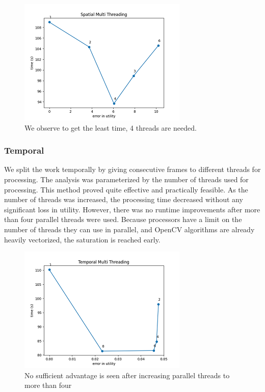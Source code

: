 \documentclass[conference]{IEEEtran}
\begin{document}
\begin{figure}[htbp]
    \centerline{\includegraphics{plots/plot_split_frame.png}}
    \caption{We observe to get the least time, 4 threads are needed.}
    \label{smt_evt}
\end{figure}


\subsubsection{Temporal}
We split the work temporally by giving consecutive frames to different threads for processing. The analysis was parameterized by the number of threads used for processing. This method proved quite effective and practically feasible. As the number of threads was increased, the processing time decreased without any significant loss in utility.
However, there was no runtime improvements after more than four parallel threads were used. Because processors have a limit on the number of threads they can use in parallel, and OpenCV algorithms are already heavily vectorized, the saturation is reached early.

\begin{figure}[htbp]
    \centerline{\includegraphics{plots/plot_split_video.png}}
    \caption{No sufficient advantage is seen after increasing parallel threads to more than four}
    \label{tmt_pvt}
\end{figure}
\end{document}
